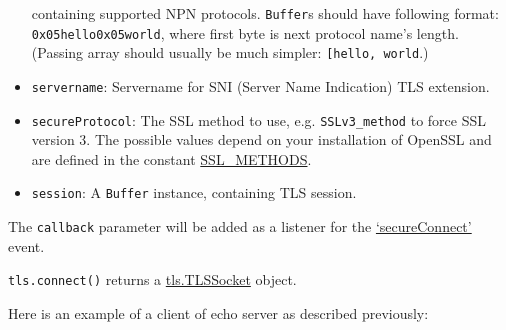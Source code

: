 \begin{itemize}
  containing supported NPN protocols. \texttt{Buffer}s should have
  following format: \texttt{0x05hello0x05world}, where first byte is
  next protocol name's length. (Passing array should usually be much
  simpler:
  \texttt{{[}\textquotesingle{}hello\textquotesingle{},\ \textquotesingle{}world\textquotesingle{}{]}}.)
\item
  \texttt{servername}: Servername for SNI (Server Name Indication) TLS
  extension.
\item
  \texttt{secureProtocol}: The SSL method to use, e.g.
  \texttt{SSLv3\_method} to force SSL version 3. The possible values
  depend on your installation of OpenSSL and are defined in the constant
  \href{http://www.openssl.org/docs/ssl/ssl.html\#DEALING_WITH_PROTOCOL_METHODS}{SSL\_METHODS}.
\item
  \texttt{session}: A \texttt{Buffer} instance, containing TLS session.
\end{itemize}

The \texttt{callback} parameter will be added as a listener for the
\hyperref[tlsux5feventux5fsecureconnect]{`secureConnect'} event.

\texttt{tls.connect()} returns a
\hyperref[tlsux5fclassux5ftlsux5ftlssocket]{tls.TLSSocket} object.

Here is an example of a client of echo server as described previously:

